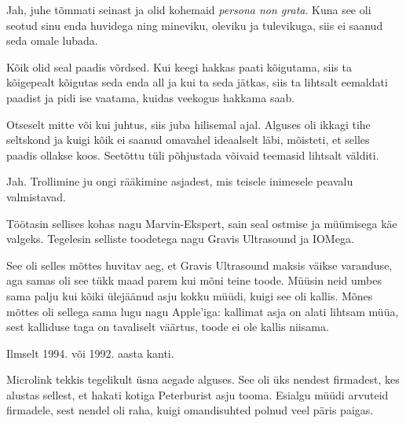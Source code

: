 
Jah, juhe tõmmati seinast ja olid kohemaid \emph{persona 
non grata}. Kuna see oli seotud sinu enda huvidega ning
mineviku, oleviku ja tulevikuga, siis ei saanud seda omale lubada.


Kõik olid seal paadis võrdsed. Kui keegi hakkas paati 
kõigutama, siis ta kõigepealt kõigutas seda enda all ja kui ta seda jätkas, siis ta lihtsalt eemaldati paadist ja pidi ise vaatama, kuidas 
veekogus hakkama saab.


Otseselt mitte või kui juhtus, siis juba hilisemal ajal. 
Alguses oli ikkagi tihe seltskond ja kuigi kõik ei saanud omavahel 
ideaalselt läbi, mõisteti, et selles paadis ollakse koos. Seetõttu tüli põhjustada võivaid teemasid
lihtsalt välditi.


Jah. Trollimine ju ongi rääkimine asjadest, mis teisele 
inimesele peavalu valmistavad.


Töötasin sellises kohas nagu Marvin-Ekspert, sain seal ostmise ja müümisega käe valgeks. Tegelesin selliste toodetega nagu Gravis Ultrasound ja 
IOMega.

See oli selles mõttes huvitav aeg, et Gravis Ultrasound maksis väikse 
varanduse, aga samas oli see tükk maad parem kui mõni teine toode. Müüsin neid umbes sama palju kui kõiki 
ülejäänud asju kokku müüdi, kuigi see oli kallis. Mõnes mõttes oli sellega sama lugu nagu 
Apple'iga: kallimat asja on alati lihtsam müüa, sest kalliduse taga on tavaliselt 
väärtus, toode ei ole kallis niisama.


Ilmselt 1994. või 1992. aasta kanti.


Microlink tekkis tegelikult üsna aegade alguses. See oli üks nendest firmadest, kes 
alustas sellest, et hakati kotiga Peterburist asju tooma. Esialgu müüdi 
arvuteid firmadele, sest nendel oli raha, kuigi 
omandisuhted polnud veel päris paigas.


